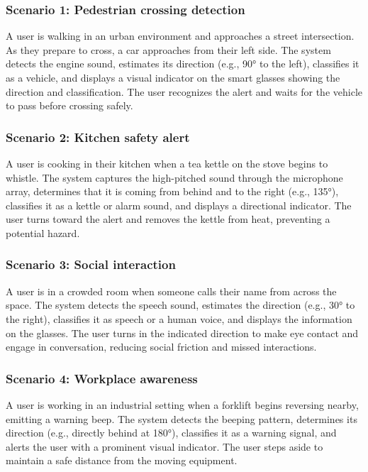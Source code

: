\documentclass[12pt]{article}
\theoremstyle{definition}
\begin{document}
\subsubsection{Scenario 1: Pedestrian crossing detection}
A user is walking in an urban environment and approaches a street intersection.
As they prepare to cross, a car approaches from their left side. The system
detects the engine sound, estimates its direction (e.g., 90° to the left),
classifies it as a vehicle, and displays a visual indicator on the smart glasses
showing the direction and classification. The user recognizes the alert and
waits for the vehicle to pass before crossing safely.
 
\subsubsection{Scenario 2: Kitchen safety alert}
A user is cooking in their kitchen when a tea kettle on the stove begins to
whistle. The system captures the high-pitched sound through the microphone
array, determines that it is coming from behind and to the right (e.g., 135°),
classifies it as a kettle or alarm sound, and displays a directional indicator.
The user turns toward the alert and removes the kettle from heat, preventing a
potential hazard.

\subsubsection{Scenario 3: Social interaction}
A user is in a crowded room when someone calls their name from across the space.
The system detects the speech sound, estimates the direction (e.g., 30° to the
right), classifies it as speech or a human voice, and displays the information
on the glasses. The user turns in the indicated direction to make eye contact
and engage in conversation, reducing social friction and missed interactions.

\subsubsection{Scenario 4: Workplace awareness}
A user is working in an industrial setting when a forklift begins reversing
nearby, emitting a warning beep. The system detects the beeping pattern,
determines its direction (e.g., directly behind at 180°), classifies it as a
warning signal, and alerts the user with a prominent visual indicator. The user
steps aside to maintain a safe distance from the moving equipment.
\end{document}
